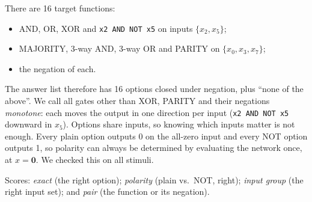 \documentclass[10pt]{article}
\begin{document}
There are 16 target functions:
\begin{itemize}
\item AND, OR, XOR and \texttt{x2 AND NOT x5} on inputs $\{x_2,x_5\}$;
\item MAJORITY, 3-way AND, 3-way OR and PARITY on $\{x_0,x_3,x_7\}$;
\item the negation of each.
\end{itemize}
The answer list therefore has 16 options closed under negation, plus ``none of the above''. We call all gates other than XOR, PARITY and their negations \emph{monotone}: each moves the output in one direction per input (\texttt{x2 AND NOT x5} downward in $x_5$). Options share inputs, so knowing which inputs matter is not enough. Every plain option outputs 0 on the all-zero input and every NOT option outputs 1, so polarity can always be determined by evaluating the network once, at $x=\mathbf{0}$. We checked this on all \nRFiveNStimuli{} stimuli.

Scores: \emph{exact} (the right option); \emph{polarity} (plain vs.\ NOT, right); \emph{input group} (the right input set); and \emph{pair} (the function or its negation).
\end{document}
